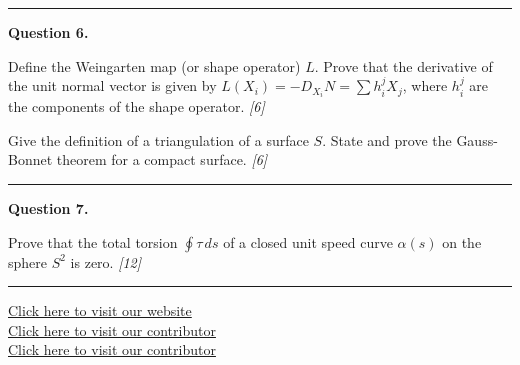 \documentclass[11pt,a4paper]{article}
\newcommand{\pts}[1]{\hfill   \textit{[#1]}}
\begin{document}
\medskip\rule{\linewidth}{0.2pt}

\medskip


\noindent   \textbf{Question 6.}

\begin{parts}
  \item Define the Weingarten map (or shape operator) $L$. Prove that the derivative of the unit normal vector is given by $L(X_i) = -D_{X_i} N = \sum h_i^j X_j$, where $h_i^j$ are the components of the shape operator. \pts{6}
  \item Give the definition of a triangulation of a surface $S$. State and prove the Gauss-Bonnet theorem for a compact surface. \pts{6}
\end{parts}

\medskip\rule{\linewidth}{0.2pt}

\medskip


\noindent   \textbf{Question 7.}

\begin{parts}
  \item Prove that the total torsion $\oint  \tau \, ds$ of a closed unit speed curve $\alpha(s)$ on the sphere $S^2$ is zero. \pts{12}
\end{parts}

\vfill
\rule{\linewidth}{0.4pt}

\begin{center}\small
  \href{https://bhu-exam.vercel.app/}{Click here to visit our website}\\[4pt]
  \href{https://me-aryan.vercel.app/}{Click here to visit our contributor}\\[4pt]
  \href{https://quashan-me.vercel.app/}{Click here to visit our contributor}
\end{center}
\end{document}
